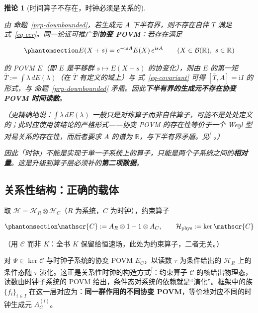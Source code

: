 \documentclass[
  chinese,
  a4paper,
  UTF8,
  12pt,
  oneside,
  openany]{ctexbook}
\theoremstyle{plain}
\theoremstyle{plain}
\theoremstyle{plain}
\theoremstyle{definition}
\theoremstyle{plain}
\newtheorem{corollary}{推论}[chapter]
\theoremstyle{plain}
\theoremstyle{remark}
\begin{document}
\begin{corollary}[时间算子不存在，时钟必须是关系的]\protect\hypertarget{cor-no-time-operator}{}\label{cor-no-time-operator}

由 命题~\ref{prp-downbounded}，若生成元 \(A\) 下半有界，则不存在自伴
\(T\) 满足 式~\ref{eq-ccr}。同一论证可推广到\textbf{协变
POVM}：若存在满足

\begin{equation}\protect\phantomsection\label{eq-covariant}{
E(X+s) = e^{-\mathrm{i}sA}E(X)\,e^{\mathrm{i}sA}
\qquad (X\in\mathcal{B}(\mathbb{R}),\ s\in\mathbb{R})
}\end{equation}

的 POVM \(E\)（即 \(E\) 是平移群 \(s\mapsto E(X+s)\) 的协变化），则由
\(E\) 的第一矩 \(\bar T:=\int\lambda\,dE(\lambda)\)（在 \(\bar T\)
有定义的域上）与 式~\ref{eq-covariant} 可得 \([\bar T,A]=\mathrm{i}I\)
的形式，与 命题~\ref{prp-downbounded}
矛盾。因此\textbf{下半有界的生成元不存在协变 POVM 时间读数}。

（更精确地说：\(\int\lambda\,dE(\lambda)\)
一般只是对称算子而非自伴算子，可能不是处处定义的；此时应使用该结论的严格形式------协变
POVM 的存在性等价于一个 Weyl 型对易关系的存在性，而后者要求 \(A\) 的谱为
\(\mathbb{R}\)，与下半有界矛盾。见\textsuperscript{{[}\citeproc{ref-busch1995}{30}{]}}
。）

因此「时钟」不能是实现于单一子系统上的算子，只能是两个子系统之间的\textbf{相对量}。这是升级到算子层必须补的\textbf{第二项数据}。

\end{corollary}

\subsection{关系性结构：正确的载体}\label{ux5173ux7cfbux6027ux7ed3ux6784ux6b63ux786eux7684ux8f7dux4f53}

取 \(\mathcal{H} = \mathcal{H}_{R}\otimes\mathcal{H}_{C}\)（\(R\)
为系统，\(C\) 为时钟），约束算子

\begin{equation}\protect\phantomsection\label{eq-constraint}{
\mathscr{C} := A_{R}\otimes 1 - 1\otimes A_{C},
\qquad
\mathcal{H}_{\mathrm{phys}} := \ker \mathscr{C}
}\end{equation}

（用 \(\mathscr{C}\) 而非 \(K\)：全书 \(K\)
保留给恒速场，此处为约束算子，二者无关。）

对 \(\Psi\in\ker \mathscr{C}\) 与时钟子系统的协变 POVM \(E_C\)，以读数
\(\tau\) 为条件给出的 \(\mathcal{H}_R\) 上的条件态随 \(\tau\)
演化。这正是关系性时钟的构造方式\textsuperscript{{[}\citeproc{ref-pagewootters1983}{31}{]}}：约束算子
\(\mathscr{C}\) 的核给出物理态，读数由时钟子系统的 POVM
给出，条件态对系统的依赖就是``演化''。框架中的族 \(\{f_i\}_{i\in I}\)
在这一层对应为：\textbf{同一群作用的不同协变
POVM}，等价地对应不同的时钟生成元 \(A_C^{(i)}\)。
\end{document}
